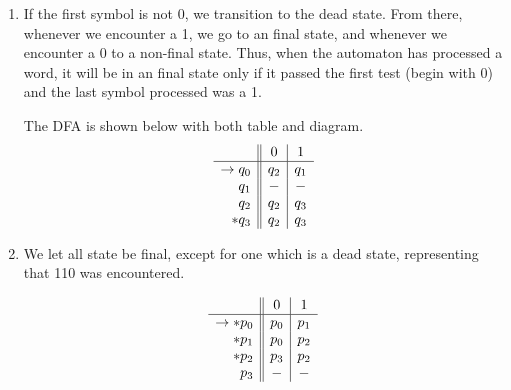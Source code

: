 \documentclass{article}
\begin{document}
\renewcommand{\labelenumi}{(\alph{enumi})}
\begin{enumerate}
    \item 
        If the first symbol is not 0, we transition to the dead state. From there, whenever we encounter a 1, we go to an final state, and whenever we encounter a 0 to a non-final state. Thus, when the automaton has processed a word, it will be in an final state only if it passed the first test (begin with 0) and the last symbol processed was a 1.        

        The DFA is shown below with both table and diagram.
        \begin{align*}
            \begin{array}{r || c | c}
             & 0 & 1 \\ \hline
             \to q_0 & q_2 & q_1 \\ 
                q_1 & - & - \\
                q_2 & q_2 & q_3 \\
                *q_3 & q_2 & q_3
            \end{array}
        \end{align*}

        \begin{center}
        \end{center}

    \item
        We let all state be final, except for one which is a dead state, representing that 110 was encountered.

        \begin{align*}
            \begin{array}{r || c | c}
                         & 0   & 1 \\ \hline
                \to *p_0 & p_0 & p_1 \\
                    *p_1 & p_0 & p_2 \\
                    *p_2 & p_3 & p_2 \\
                     p_3 & -   & -
            \end{array}
        \end{align*}


\end{enumerate}
\end{document}
